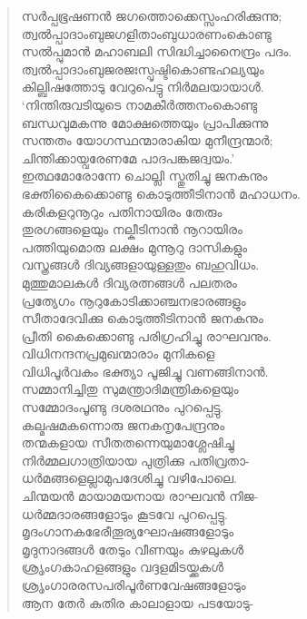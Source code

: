 \begin{verse}
സര്‍പ്പഭൂഷണന്‍ ജഗത്തൊക്കെസ്സംഹരിക്കുന്നു;\\
ത്വല്‍പ്പാദാംബുജഗളിതാംബുധാരണംകൊണ്ടു\\
സല്‍പ്പുമാന്‍ മഹാബലി സിദ്ധിച്ചാനൈന്ദ്രം പദം.\\
ത്വല്‍പ്പാദാംബുജരജഃസ്പൃഷ്ടികൊണ്ടഹല്യയും\\
കില്ബിഷത്തോടു വേറുപെട്ടു നിര്‍മലയായാള്‍.\\
‘നിന്തിരുവടിയുടെ നാമകീര്‍ത്തനംകൊണ്ടു\\
ബന്ധവുമകന്നു മോക്ഷത്തെയും പ്രാപിക്കുന്നു\\
സന്തതം യോഗസ്ഥന്മാരാകിയ മുനീന്ദ്രന്മാര്‍;\\
ചിന്തിക്കായ്വരേണമേ പാദപങ്കജദ്വയം.’\\
ഇത്ഥമോരോന്നേ ചൊല്ലി സ്തുതിച്ചു ജനകനും\\
ഭക്തികൈക്കൊണ്ടു കൊടുത്തീടിനാന്‍ മഹാധനം.\\
കരികളറുനൂറും പതിനായിരം തേരും\\
തുരഗങ്ങളെയും നല്കീടിനാന്‍ നൂറായിരം\\
പത്തിയുമൊരു ലക്ഷം മുന്നൂറു ദാസികളും\\
വസ്ത്രങ്ങള്‍ ദിവ്യങ്ങളായുള്ളതും ബഹുവിധം.\\
മുത്തുമാലകള്‍ ദിവ്യരത്നങ്ങള്‍ പലതരം\\
പ്രത്യേഗം നൂറുകോടിക്കാഞ്ചനഭാരങ്ങളും\\
സീതാദേവിക്കു കൊടുത്തീടിനാന്‍ ജനകനും\\
പ്രീതി കൈക്കൊണ്ടു പരിഗ്രഹിച്ചു രാഘവനും.\\
വിധിനന്ദനപ്രമുഖന്മാരാം മുനികളെ\\
വിധിപൂര്‍വകം ഭക്ത്യാ പൂജിച്ചു വണങ്ങിനാന്‍.\\
സമ്മാനിച്ചിതു സുമന്ത്രാദിമന്ത്രികളെയും\\
സമ്മോദംപൂണ്ടു ദശരഥനും പുറപ്പെട്ടു.\\
കല്മഷമകന്നൊരു ജനകനൃപേന്ദ്രനും\\
തന്മകളായ സീതതന്നെയുമാശ്ലേഷിച്ചു\\
നിര്‍മ്മലഗാത്രിയായ പുത്രിക്കു പതിവ്രതാ-\\
ധര്‍മങ്ങളെല്ലാമുപദേശിച്ചു വഴിപോലെ.\\
ചിന്മയന്‍ മായാമയനായ രാഘവന്‍ നിജ-\\
ധര്‍മ്മദാരങ്ങളോടും കൂടവേ പുറപ്പെട്ടു.\\
മൃദംഗാനകഭേരീതൂര്യഘോഷങ്ങളോടും\\
മൃദുനാദങ്ങള്‍ തേടും വീണയും കുഴലുകള്‍\\
ശ്രൃംഗകാഹളങ്ങളും വദ്ദളമിടയ്ക്കകള്‍\\
ശ്രൃംഗാരരസപരിപൂര്‍ണവേഷങ്ങളോടും\\
ആന തേര്‍ കുതിര കാലാളായ പടയോടു-\\

\end{verse}

